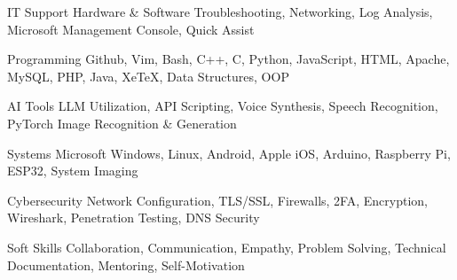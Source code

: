 
\begin{cvskills}
  \cvskill
    {IT Support} %
	{Hardware \& Software Troubleshooting, Networking, Log Analysis, Microsoft Management Console, Quick Assist} %

  \cvskill
    {Programming} %
    {Github, Vim, Bash, C++, C, Python, JavaScript, HTML, Apache, MySQL, PHP, Java, XeTeX, Data Structures, OOP} %

  \cvskill
    {AI Tools} %
	{LLM Utilization, API Scripting, Voice Synthesis, Speech Recognition, PyTorch Image Recognition \& Generation} %

  \cvskill
    {Systems} %
	{Microsoft Windows, Linux, Android, Apple iOS, Arduino, Raspberry Pi, ESP32, System Imaging} %

  \cvskill
    {Cybersecurity} %
	{Network Configuration, TLS/SSL, Firewalls, 2FA, Encryption, Wireshark, Penetration Testing, DNS Security} %

  \cvskill
    {Soft Skills} %
	{Collaboration, Communication, Empathy, Problem Solving, Technical Documentation, Mentoring, Self-Motivation} %

\end{cvskills}
